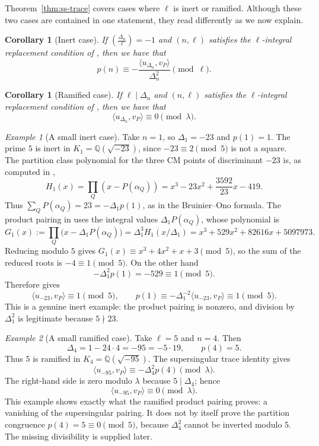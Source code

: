 \documentclass[12pt]{amsart}
\newtheorem{corollary}[theorem]{Corollary}
\theoremstyle{definition}
\theoremstyle{remark}
\newtheorem*{example}{Example}
\newcommand{\Q}{\mathbb{Q}}
\begin{document}
Theorem~\ref{thm:ss-trace} covers cases where $\ell$ is inert or ramified.  Although these two cases are contained in one statement,  they read differently as we now explain.

\begin{corollary}[Inert case]\label{cor:inert}
If $\left(\tfrac{\Delta_n}{\ell}\right)=-1$ and $(n,\ell)$ satisfies the $\ell$-integral replacement condition of , then  we have that
\[
p(n)\equiv-\frac{\langle u_{\Delta_n},v_P\rangle}{\Delta_n^2}\pmod\ell.
\]
\end{corollary}

\begin{corollary}[Ramified case]\label{cor:ram}
If $\ell\mid\Delta_n$ and $(n,\ell)$ satisfies the $\ell$-integral replacement condition of , then we have that
\[
\langle u_{\Delta_n},v_P\rangle\equiv0\pmod\lambda.
\]
\end{corollary}


\begin{example}[A small inert case]\label{ex:intro-inert}
Take $n=1$, so $\Delta_1=-23$ and $p(1)=1$.  The prime $5$ is inert in
$K_1=\Q(\sqrt{-23})$, since $-23\equiv2\pmod5$ is not a square.  The partition class
polynomial for the three CM points of discriminant $-23$ is, as computed in
\cite{BOSJNT},
\[
        H_1(x)=\prod_Q(x-P(\alpha_Q))
        =x^3-23x^2+\frac{3592}{23}x-419.
\]
Thus $\sum_QP(\alpha_Q)=23=-\Delta_1p(1)$, as in the Bruinier--Ono formula.  The product
pairing in  uses the integral values $\Delta_1P(\alpha_Q)$, whose
polynomial is
\[
        G_1(x):=\prod_Q\bigl(x-\Delta_1P(\alpha_Q)\bigr)
        =\Delta_1^3H_1(x/\Delta_1)
        =x^3+529x^2+82616x+5097973.
\]
Reducing modulo $5$ gives $G_1(x)\equiv x^3+4x^2+x+3\pmod5$, so the sum of the reduced
roots is $-4\equiv1\pmod5$.  On the other hand
\[
        -\Delta_1^2p(1)=-529\equiv1\pmod5.
\]
Therefore  gives
\[
        \langle u_{-23},v_P\rangle\equiv1\pmod5,
        \qquad
        p(1)\equiv-\Delta_1^{-2}\langle u_{-23},v_P\rangle\equiv1\pmod5.
\]
This is a genuine inert example: the product pairing is nonzero, and division by
$\Delta_1^2$ is legitimate because $5\nmid23$.
\end{example}

\begin{example}[A small ramified case]\label{ex:intro-ramified}
Take $\ell=5$ and $n=4$.  Then
\[
        \Delta_4=1-24\cdot4=-95=-5\cdot19,
        \qquad p(4)=5.
\]
Thus $5$ is ramified in $K_4=\Q(\sqrt{-95})$.  The supersingular trace identity gives
\[
        \langle u_{-95},v_P\rangle\equiv -\Delta_4^2p(4)\pmod\lambda.
\]
The right-hand side is zero modulo $\lambda$ because $5\mid\Delta_4$; hence
\[
        \langle u_{-95},v_P\rangle\equiv0\pmod\lambda.
\]
This example shows exactly what the ramified product pairing
proves: a vanishing of the supersingular pairing.  It does not by itself prove the partition
congruence $p(4)=5\equiv0\pmod5$, because $\Delta_4^2$ cannot be inverted modulo $5$.  The
missing divisibility is supplied later.
\end{example}
\end{document}
